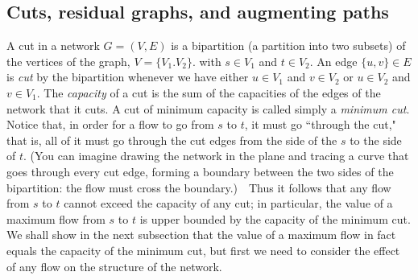 \documentclass[11pt]{article}
\begin{document}
\subsection{Cuts, residual graphs, and augmenting paths}
A cut in a network $G=(V,E)$ is a bipartition (a partition into two
subsets) of the vertices of the graph, $V=\{V_1.V_2\}$. with $s\in V_1$
and $t\in V_2$.  An edge $\{u,v\}\in E$ is \emph{cut} by the bipartition
whenever we have either $u\in V_1$ and $v\in V_2$ or $u\in V_2$ and $v\in V_1$.
The \emph{capacity} of a cut is the sum of the capacities of the edges of
the network that it cuts.  A cut of minimum capacity is called simply
a \emph{minimum cut}.
Notice that, in order for a flow to go from $s$ to $t$, it must go ``through
the cut," that is, all of it must go through the cut edges from the side
of the $s$ to the side of $t$.
(You can imagine drawing the network in the plane and tracing a curve
that goes through every cut edge, forming a boundary between the two sides
of the bipartition: the flow must cross the boundary.)\ \ Thus it follows
that any flow from $s$ to $t$ cannot exceed the capacity of any cut;
in particular, the value of a maximum flow from $s$ to $t$ is upper bounded
by the capacity of the minimum cut.  We shall show in the next subsection that
the value of a maximum flow in fact equals the capacity of the minimum cut, 
but first we need to consider the effect of any flow on the structure of
the network.
\end{document}
